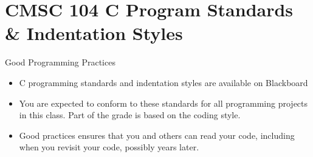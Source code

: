\documentclass[graphics]{beamer}
\begin{document}
\section{CMSC 104 C Program Standards \& Indentation Styles}
\begin{frame}{Good Programming Practices}
    \begin{itemize}
        \item C programming standards and indentation styles are available on Blackboard
        \item You are expected to conform to these standards for all programming projects in this class. Part of the grade is based on the coding style.
        \item Good practices ensures that you and others can read your code, including when you revisit your code, possibly years later.
    \end{itemize}
\end{frame}
\end{document}
